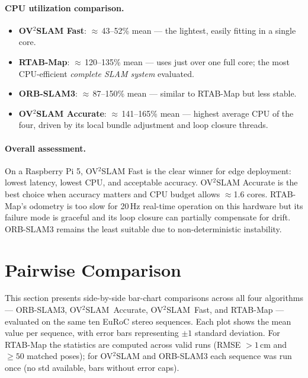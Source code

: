 \documentclass[11pt]{article}
\begin{document}
\paragraph{CPU utilization comparison.}
\begin{itemize}
    \item \textbf{OV$^2$SLAM Fast}: $\approx$\,43--52\% mean — the lightest, easily fitting in a single core.
    \item \textbf{RTAB-Map}: $\approx$\,120--135\% mean — uses just over one full core; the most CPU-efficient \emph{complete SLAM system} evaluated.
    \item \textbf{ORB-SLAM3}: $\approx$\,87--150\% mean — similar to RTAB-Map but less stable.
    \item \textbf{OV$^2$SLAM Accurate}: $\approx$\,141--165\% mean — highest average CPU of the four, driven by its local bundle adjustment and loop closure threads.
\end{itemize}

\paragraph{Overall assessment.} On a Raspberry Pi 5, OV$^2$SLAM Fast is the clear winner for edge deployment: lowest latency, lowest CPU, and acceptable accuracy. OV$^2$SLAM Accurate is the best choice when accuracy matters and CPU budget allows $\approx$1.6 cores. RTAB-Map's odometry is too slow for 20\,Hz real-time operation on this hardware but its failure mode is graceful and its loop closure can partially compensate for drift. ORB-SLAM3 remains the least suitable due to non-deterministic instability.

\section{Pairwise Comparison}
\label{sec:pairwise}

This section presents side-by-side bar-chart comparisons across all four algorithms — ORB-SLAM3, OV$^2$SLAM~Accurate, OV$^2$SLAM~Fast, and RTAB-Map — evaluated on the same ten EuRoC stereo sequences.
Each plot shows the mean value per sequence, with error bars representing $\pm1$ standard deviation.
For RTAB-Map the statistics are computed across valid runs (RMSE $>1\,$cm and $\geq50$ matched poses); for OV$^2$SLAM and ORB-SLAM3 each sequence was run once (no std available, bars without error caps).
\end{document}
